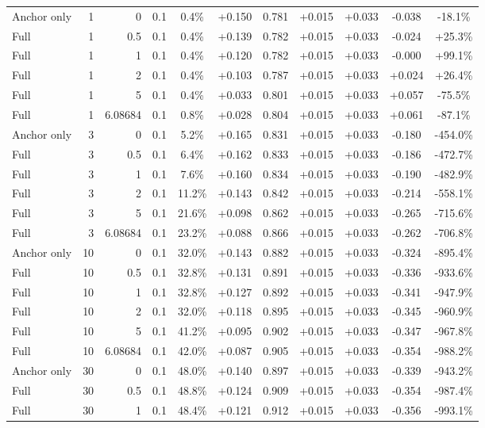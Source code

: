 \begin{table}[htbp]
\begin{tabular}{lrrrccccccc}
Anchor only & 1 & 0 & 0.1 & 0.4\% & +0.150 & 0.781 & +0.015 & +0.033 & -0.038 & -18.1\% \\
Full & 1 & 0.5 & 0.1 & 0.4\% & +0.139 & 0.782 & +0.015 & +0.033 & -0.024 & +25.3\% \\
Full & 1 & 1 & 0.1 & 0.4\% & +0.120 & 0.782 & +0.015 & +0.033 & -0.000 & +99.1\% \\
Full & 1 & 2 & 0.1 & 0.4\% & +0.103 & 0.787 & +0.015 & +0.033 & +0.024 & +26.4\% \\
Full & 1 & 5 & 0.1 & 0.4\% & +0.033 & 0.801 & +0.015 & +0.033 & +0.057 & -75.5\% \\
Full & 1 & 6.08684 & 0.1 & 0.8\% & +0.028 & 0.804 & +0.015 & +0.033 & +0.061 & -87.1\% \\
Anchor only & 3 & 0 & 0.1 & 5.2\% & +0.165 & 0.831 & +0.015 & +0.033 & -0.180 & -454.0\% \\
Full & 3 & 0.5 & 0.1 & 6.4\% & +0.162 & 0.833 & +0.015 & +0.033 & -0.186 & -472.7\% \\
Full & 3 & 1 & 0.1 & 7.6\% & +0.160 & 0.834 & +0.015 & +0.033 & -0.190 & -482.9\% \\
Full & 3 & 2 & 0.1 & 11.2\% & +0.143 & 0.842 & +0.015 & +0.033 & -0.214 & -558.1\% \\
Full & 3 & 5 & 0.1 & 21.6\% & +0.098 & 0.862 & +0.015 & +0.033 & -0.265 & -715.6\% \\
Full & 3 & 6.08684 & 0.1 & 23.2\% & +0.088 & 0.866 & +0.015 & +0.033 & -0.262 & -706.8\% \\
Anchor only & 10 & 0 & 0.1 & 32.0\% & +0.143 & 0.882 & +0.015 & +0.033 & -0.324 & -895.4\% \\
Full & 10 & 0.5 & 0.1 & 32.8\% & +0.131 & 0.891 & +0.015 & +0.033 & -0.336 & -933.6\% \\
Full & 10 & 1 & 0.1 & 32.8\% & +0.127 & 0.892 & +0.015 & +0.033 & -0.341 & -947.9\% \\
Full & 10 & 2 & 0.1 & 32.0\% & +0.118 & 0.895 & +0.015 & +0.033 & -0.345 & -960.9\% \\
Full & 10 & 5 & 0.1 & 41.2\% & +0.095 & 0.902 & +0.015 & +0.033 & -0.347 & -967.8\% \\
Full & 10 & 6.08684 & 0.1 & 42.0\% & +0.087 & 0.905 & +0.015 & +0.033 & -0.354 & -988.2\% \\
Anchor only & 30 & 0 & 0.1 & 48.0\% & +0.140 & 0.897 & +0.015 & +0.033 & -0.339 & -943.2\% \\
Full & 30 & 0.5 & 0.1 & 48.8\% & +0.124 & 0.909 & +0.015 & +0.033 & -0.354 & -987.4\% \\
Full & 30 & 1 & 0.1 & 48.4\% & +0.121 & 0.912 & +0.015 & +0.033 & -0.356 & -993.1\% \\

\end{tabular}
\end{table}
